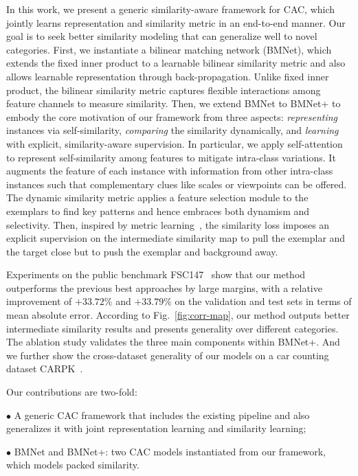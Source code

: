 \documentclass[10pt,twocolumn,letterpaper]{article}
\begin{document}
In this work, we present a generic similarity-aware framework for CAC, which jointly learns representation and similarity metric in an end-to-end manner. Our goal is to seek better similarity modeling that can generalize well to novel categories. First, 
we instantiate a bilinear matching network (BMNet), which extends the fixed inner product to a learnable bilinear similarity metric and also allows learnable representation through back-propagation. Unlike fixed inner product, the bilinear similarity metric captures flexible interactions among feature channels to measure similarity. Then, we extend BMNet to BMNet+ to embody the core motivation of our framework from three aspects: 
\textit{representing} instances via self-similarity, \textit{comparing} the similarity dynamically, and \textit{learning} with explicit, similarity-aware supervision. 
In particular, we apply self-attention~\cite{sa_gan} to represent self-similarity among features to mitigate intra-class variations. It augments the feature of each instance with information from other intra-class instances 
such that complementary clues like scales or viewpoints can be offered.
The dynamic similarity metric applies a feature selection module to the exemplars to find key patterns and hence embraces both dynamism and selectivity. Then, inspired by metric learning~\cite{metric_learning_reality_check}, the similarity loss imposes an explicit supervision on the intermediate similarity map to pull the exemplar and the target close but 
to 
push the exemplar and background away. 

Experiments on the public benchmark FSC147~\cite{famnet} show that our method outperforms the previous best approaches by large margins, with a relative improvement of $+33.72\%$ and $+33.79\%$ on the validation and test sets in terms of mean absolute error. According to Fig.~\ref{fig:corr-map}, our method outputs better intermediate similarity results and presents generality over different categories. The ablation study validates the three main components within BMNet+. And we further show the cross-dataset generality of our models on a car counting dataset CARPK~\cite{carpk}.

Our contributions are two-fold:

$\bullet$ A generic CAC framework that includes the existing pipeline and also generalizes it with joint representation learning and similarity learning;

$\bullet$ BMNet and BMNet+: two CAC models instantiated from our framework, which models packed similarity.
\end{document}
